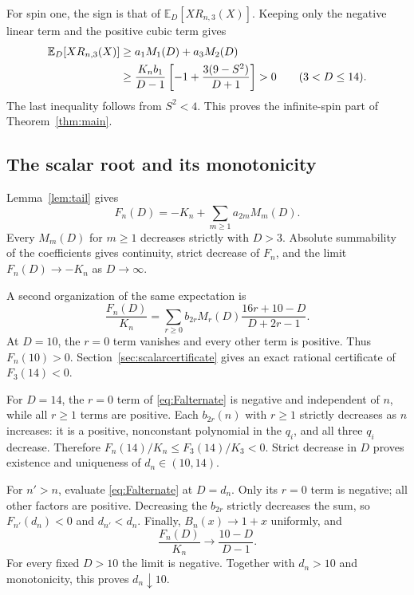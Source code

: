 \documentclass[11pt,a4paper]{article}
\theoremstyle{remark}\newtheorem{remark}[theorem]{Remark}
\newcommand{\E}{\mathbb E}
\begin{document}
For spin one, the sign is that of $\E_D[X R_{n,3}(X)]$. Keeping only the negative linear term and the positive cubic term gives
\begin{align}\label{eq:spinone}
 \E_D[X R_{n,3}(X)]
 &\geq a_1M_1(D)+a_3M_2(D)\notag\\
 &\geq\frac{K_n b_1}{D-1}
 \left[-1+\frac{3(9-S^2)}{D+1}\right]>0
 \qquad(3<D\leq14).
\end{align}
The last inequality follows from $S^2<4$. This proves the infinite-spin part of Theorem~\ref{thm:main}.

\subsection{The scalar root and its monotonicity}
Lemma~\ref{lem:tail} gives
\begin{equation}\label{eq:Fdecreasing}
 F_n(D)=-K_n+\sum_{m\geq1}a_{2m}M_m(D).
\end{equation}
Every $M_m(D)$ for $m\geq1$ decreases strictly with $D>3$. Absolute summability of the coefficients gives continuity, strict decrease of $F_n$, and the limit $F_n(D)\to-K_n$ as $D\to\infty$.

A second organization of the same expectation is
\begin{equation}\label{eq:Falternate}
 \frac{F_n(D)}{K_n}
 =\sum_{r\geq0}b_{2r}M_r(D)
 \frac{16r+10-D}{D+2r-1}.
\end{equation}
At $D=10$, the $r=0$ term vanishes and every other term is positive. Thus $F_n(10)>0$. Section~\ref{sec:scalarcertificate} gives an exact rational certificate of $F_3(14)<0$.

For $D=14$, the $r=0$ term of \eqref{eq:Falternate} is negative and independent of $n$, while all $r\geq1$ terms are positive. Each $b_{2r}(n)$ with $r\geq1$ strictly decreases as $n$ increases: it is a positive, nonconstant polynomial in the $q_i$, and all three $q_i$ decrease. Therefore $F_n(14)/K_n\leq F_3(14)/K_3<0$. Strict decrease in $D$ proves existence and uniqueness of $d_n\in(10,14)$.

For $n'>n$, evaluate \eqref{eq:Falternate} at $D=d_n$. Only its $r=0$ term is negative; all other factors are positive. Decreasing the $b_{2r}$ strictly decreases the sum, so $F_{n'}(d_n)<0$ and $d_{n'}<d_n$. Finally, $B_n(x)\to1+x$ uniformly, and
\begin{equation}
 \frac{F_n(D)}{K_n}\longrightarrow\frac{10-D}{D-1}.
\end{equation}
For every fixed $D>10$ the limit is negative. Together with $d_n>10$ and monotonicity, this proves $d_n\downarrow10$.
\end{document}
